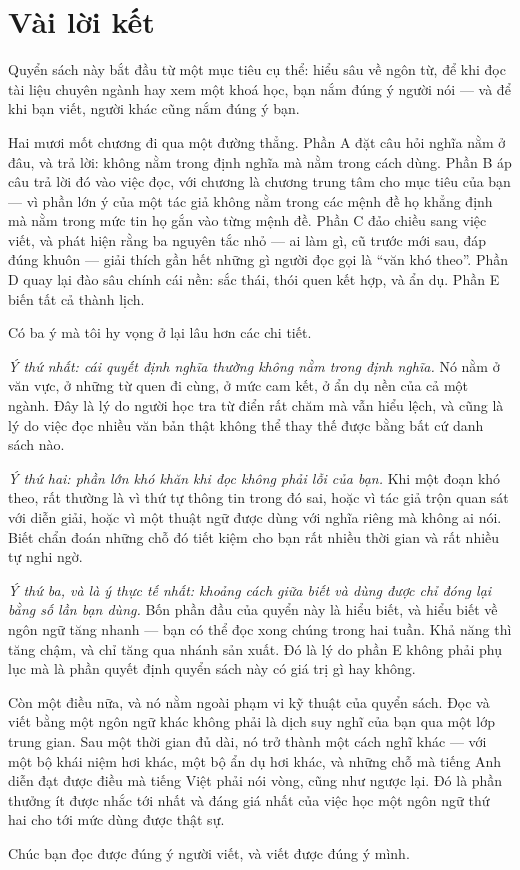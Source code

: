 \documentclass[english.tex]{subfiles}
\begin{document}
\chapter*{Vài lời kết}

Quyển sách này bắt đầu từ một mục tiêu cụ thể: hiểu sâu về ngôn từ, để khi đọc tài liệu chuyên ngành hay xem một khoá học, bạn nắm đúng ý người nói --- và để khi bạn viết, người khác cũng nắm đúng ý bạn.

Hai mươi mốt chương đi qua một đường thẳng. Phần A đặt câu hỏi nghĩa nằm ở đâu, và trả lời: không nằm trong định nghĩa mà nằm trong cách dùng. Phần B áp câu trả lời đó vào việc đọc, với chương  là chương trung tâm cho mục tiêu của bạn --- vì phần lớn ý của một tác giả không nằm trong các mệnh đề họ khẳng định mà nằm trong mức tin họ gắn vào từng mệnh đề. Phần C đảo chiều sang việc viết, và phát hiện rằng ba nguyên tắc nhỏ --- ai làm gì, cũ trước mới sau, đáp đúng khuôn --- giải thích gần hết những gì người đọc gọi là ``văn khó theo''. Phần D quay lại đào sâu chính cái nền: sắc thái, thói quen kết hợp, và ẩn dụ. Phần E biến tất cả thành lịch.

Có ba ý mà tôi hy vọng ở lại lâu hơn các chi tiết.

\emph{Ý thứ nhất: cái quyết định nghĩa thường không nằm trong định nghĩa.} Nó nằm ở văn vực, ở những từ quen đi cùng, ở mức cam kết, ở ẩn dụ nền của cả một ngành. Đây là lý do người học tra từ điển rất chăm mà vẫn hiểu lệch, và cũng là lý do việc đọc nhiều văn bản thật không thể thay thế được bằng bất cứ danh sách nào.

\emph{Ý thứ hai: phần lớn khó khăn khi đọc không phải lỗi của bạn.} Khi một đoạn khó theo, rất thường là vì thứ tự thông tin trong đó sai, hoặc vì tác giả trộn quan sát với diễn giải, hoặc vì một thuật ngữ được dùng với nghĩa riêng mà không ai nói. Biết chẩn đoán những chỗ đó tiết kiệm cho bạn rất nhiều thời gian và rất nhiều tự nghi ngờ.

\emph{Ý thứ ba, và là ý thực tế nhất: khoảng cách giữa biết và dùng được chỉ đóng lại bằng số lần bạn dùng.} Bốn phần đầu của quyển này là hiểu biết, và hiểu biết về ngôn ngữ tăng nhanh --- bạn có thể đọc xong chúng trong hai tuần. Khả năng thì tăng chậm, và chỉ tăng qua nhánh sản xuất. Đó là lý do phần E không phải phụ lục mà là phần quyết định quyển sách này có giá trị gì hay không.

Còn một điều nữa, và nó nằm ngoài phạm vi kỹ thuật của quyển sách. Đọc và viết bằng một ngôn ngữ khác không phải là dịch suy nghĩ của bạn qua một lớp trung gian. Sau một thời gian đủ dài, nó trở thành một cách nghĩ khác --- với một bộ khái niệm hơi khác, một bộ ẩn dụ hơi khác, và những chỗ mà tiếng Anh diễn đạt được điều mà tiếng Việt phải nói vòng, cũng như ngược lại. Đó là phần thưởng ít được nhắc tới nhất và đáng giá nhất của việc học một ngôn ngữ thứ hai cho tới mức dùng được thật sự.

Chúc bạn đọc được đúng ý người viết, và viết được đúng ý mình.
\end{document}
